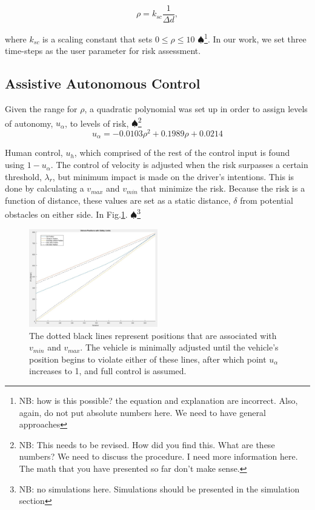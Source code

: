 \documentclass[conference]{IEEEtran}
\newcommand\NB[1]{$\spadesuit$\footnote{NB: #1}}
\begin{document}
\begin{equation}
\rho = k_{sc}\frac{1}{\Delta d},
\end{equation}

where $k_{sc}$ is a scaling constant that sets $0 \leq \rho \leq 10$ \NB{how is this possible? the equation and explanation are incorrect. Also, again, do not put absolute numbers here. We need to have general approaches}. In our work, we set three time-steps as the user parameter for risk assessment.

\subsection{Assistive Autonomous Control}

Given the range for $\rho$, a quadratic polynomial was set up in order to assign levels of autonomy, $u_{\alpha}$, to levels of risk, \NB{This needs to be revised. How did you find this. What are these numbers? We need to discuss the procedure. I need more information here. The math that you have presented so far don't make sense.}
\begin{equation}
u_{\alpha} = -0.0103\rho^{2} + 0.1989\rho + 0.0214
\end{equation}

Human control, $u_{h}$, which comprised of the rest of the control input is found using $1-u_{\alpha}$. The control of velocity is adjusted when the risk surpasses a certain threshold, $\lambda_{r}$, but minimum impact is made on the driver's intentions. This is done by calculating a $v_{max}$ and $v_{min}$ that minimize the risk. Because the risk is a function of distance, these values are set as a static distance, $\delta$ from potential obstacles on either side. In Fig.\ref{fig:vehiclepos}. \NB{no simulations here. Simulations should be presented in the simulation section}
\begin{figure}[ht]
    \includegraphics[width=0.5\textwidth]{vehiclepos.JPG}
    \caption{The dotted black lines represent positions that are associated with $v_{min}$ and $v_{max}$. The vehicle is minimally adjusted until the vehicle's position begins to violate either of these lines, after which point $u_{\alpha}$ increases to 1, and full control is assumed.}
    \label{fig:vehiclepos}
\end{figure}
\end{document}
